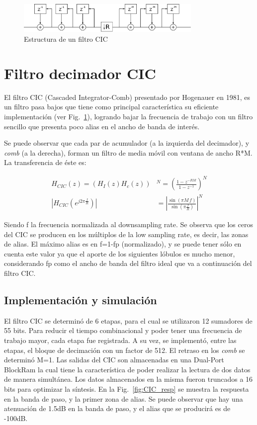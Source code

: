 \documentclass[a4paper,conference]{IEEEtran}
\begin{document}
\begin{figure}[!b]
\centering
\includegraphics[width=3.5in]{CIC_Topologia}
\caption{Estructura de un filtro CIC}
\label{fig:CIC_top}
\end{figure}

\section{Filtro decimador CIC}
El filtro CIC (Cascaded Integrator-Comb) presentado por Hogenauer en 1981\cite{CIC:Hog},  es un filtro pasa bajos que tiene como principal caracter\'istica su eficiente implementaci\'on (ver Fig.~\ref{fig:CIC_top}), logrando bajar la frecuencia de trabajo con un filtro sencillo que presenta poco alias en el ancho de banda de interés.

Se puede observar que cada par de acumulador (a la izquierda del decimador), y \textit{comb} (a la derecha), forman un filtro de media m\'ovil con ventana de ancho R*M. La transferencia de \'este es:

\begin{align}
H_{CIC}(z)= \left( H_I(z) H_c(z)\right)& ^{N}=\left( \frac{1-z^{-RM}}{1-z^{-1}}\right) ^N\\
\left| H_{CIC}(e^{j2\pi\frac{f}{R}})\right| &=\left| \frac{\sin(\pi M\,f)}{\sin(\pi \frac{f}{R})}\right| ^{N}
\end{align}

Siendo f la frecuencia normalizada al downsampling rate.
Se observa que los ceros del CIC se producen en los m\'ultiplos de la low sampling rate, es decir, las zonas de alias. El m\'aximo alias es en f=1-fp (normalizado), y se puede tener s\'olo en cuenta este valor ya que el aporte de los siguientes l\'obulos es mucho menor, considerando fp como el ancho de banda del filtro ideal que va a continuación del filtro CIC.

\subsection{Implementaci\'on y simulaci\'on}
El filtro CIC se determin\'o de 6 etapas, para el cual se utilizaron 12 sumadores de 55 bits. Para reducir el tiempo combinacional y poder tener una frecuencia de trabajo mayor, cada etapa fue registrada. A su vez, se implement\'o, entre las etapas, el bloque de decimaci\'on con un factor de 512. El retraso en los \textit{comb} se determin\'o M=1. Las salidas del CIC son almacenadas en una Dual-Port BlockRam\cite{Sp6-BR} la cual tiene la caracter\'istica de poder realizar la lectura de dos datos de manera simultánea. Los datos almacenados en la misma fueron truncados a 16 bits para optimizar la síntesis. En la Fig.~\ref{fig:CIC_resp} se muestra la respuesta en la banda de paso, y la primer zona de alias. Se puede observar que hay una atenuación de 1.5dB en la banda de paso, y el alias que se producirá es de -100dB.
\end{document}
